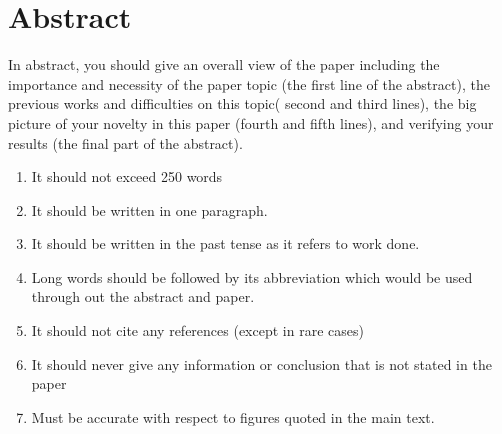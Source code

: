\documentclass{article}
\begin{document}
    \section{Abstract}
    
In abstract, you should give an overall view of the paper including the importance and necessity of the paper topic (the first line of the abstract), the previous works and difficulties on this topic( second and third lines), the big picture of your novelty in this paper (fourth and fifth lines), and verifying your results (the final part of the abstract).

\begin{enumerate}

\item It should not exceed 250 words
\item It should be written in one paragraph.
\item It should be written in the past tense as it refers to work done.
\item Long words should be followed by its abbreviation which would be used through out the abstract and paper.
\item It should not cite any references (except in rare cases)
\item It should never give any information or conclusion that is not stated in the paper
\item Must be accurate with respect to figures quoted in the main text.

\end{enumerate}
\end{document}
